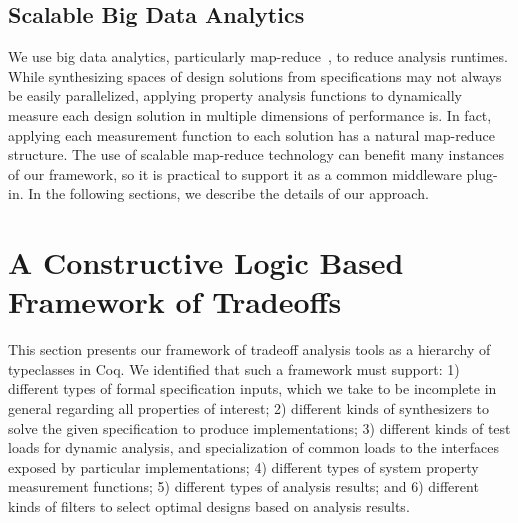 \documentclass[10pt,conference]{IEEEtran}
\begin{document}
\subsection{Scalable Big Data Analytics}
We use big data analytics, particularly map-reduce~\cite{dean2008mapreduce}, to reduce analysis runtimes. %
While synthesizing spaces of design solutions from specifications may not always be easily parallelized,
applying property analysis functions to dynamically measure each design solution in multiple dimensions of performance is. In fact, applying each measurement function to each solution has a natural map-reduce structure. The use of scalable map-reduce technology can benefit many instances of our framework, so it is practical to support it as a common middleware plug-in.
In the following sections, we describe the details of our approach.

\section{A Constructive Logic Based Framework of Tradeoffs}
\label{framework}
This section presents our framework of tradeoff analysis tools as a hierarchy of typeclasses in Coq. We identified that such a framework must support: 1) different types of formal specification inputs, which we take to be incomplete in general regarding all properties of interest; 2) different kinds of synthesizers to solve the given specification to produce implementations; 3) different kinds of test loads for dynamic analysis, and specialization of common loads to the interfaces exposed by particular implementations; 4) different types of system property measurement functions; 5) different types of analysis results; and 6) different kinds of filters to select optimal designs based on analysis results.

\end{document}
